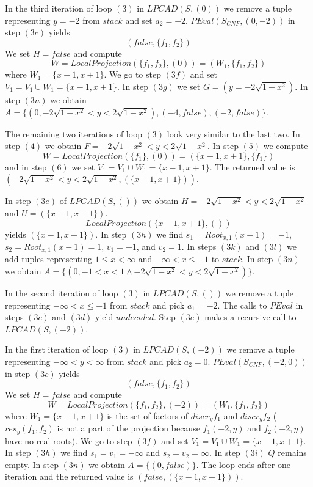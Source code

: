\documentclass[english]{amsart}
\numberwithin{equation}{section}
\numberwithin{figure}{section}
\begin{document}
In the third iteration of loop $(3)$ in $LPCAD(S,(0))$ we remove
a tuple representing $y=-2$ from $stack$ and set $a_{2}=-2$. $PEval(S_{CNF},(0,-2))$
in step $(3c)$ yields \[
(false,\{f_{1},f_{2}\})\]
We set $H=false$ and compute \[
W=LocalProjection(\{f_{1},f_{2}\},(0))=(W_{1},\{f_{1},f_{2}\})\]
where $W_{1}=\{x-1,x+1\}$. We go to step $(3f)$ and set $V_{1}=V_{1}\cup W_{1}=\{x-1,x+1\}$.
In step $(3g)$ we set $G=(y=-2\sqrt{1-x^{2}})$. In step $(3n)$
we obtain $A=\{(0,-2\sqrt{1-x^{2}}<y<2\sqrt{1-x^{2}}),(-4,false),(-2,false)\}$.

The remaining two iterations of loop $(3)$ look very similar to the
last two. In step $(4)$ we obtain $F=-2\sqrt{1-x^{2}}<y<2\sqrt{1-x^{2}}$.
In step $(5)$ we compute \[
W=LocalProjection(\{f_{1}\},(0))=(\{x-1,x+1\},\{f_{1}\})\]
 and in step $(6)$ we set $V_{1}=V_{1}\cup W_{1}=\{x-1,x+1\}$. The
returned value is $(-2\sqrt{1-x^{2}}<y<2\sqrt{1-x^{2}},(\{x-1,x+1\}))$.

In step $(3e)$ of $LPCAD(S,())$ we obtain $H=-2\sqrt{1-x^{2}}<y<2\sqrt{1-x^{2}}$
and $U=(\{x-1,x+1\})$. \[
LocalProjection(\{x-1,x+1\},())\]
 yields $(\{x-1,x+1\})$. In step $(3h)$ we find $s_{1}=Root_{x,1}(x+1)=-1$,
$s_{2}=Root_{x,1}(x-1)=1$, $v_{1}=-1$, and $v_{2}=1$. In steps
$(3k)$ and $(3l)$ we add tuples representing $1\leq x<\infty$ and
$-\infty<x\leq-1$ to $stack$. In step $(3n)$ we obtain $A=\{(0,-1<x<1\wedge-2\sqrt{1-x^{2}}<y<2\sqrt{1-x^{2}})\}$.

In the second iteration of loop $(3)$ in $LPCAD(S,())$ we remove
a tuple representing $-\infty<x\leq-1$ from $stack$ and pick $a_{1}=-2$.
The calls to $PEval$ in steps $(3c)$ and $(3d)$ yield $undecided$.
Step $(3e)$ makes a recursive call to $LPCAD(S,(-2))$.

In the first iteration of loop $(3)$ in $LPCAD(S,(-2))$ we remove
a tuple representing $-\infty<y<\infty$ from $stack$ and pick $a_{2}=0$.
$PEval(S_{CNF},(-2,0))$ in step $(3c)$ yields \[
(false,\{f_{1},f_{2}\})\]
We set $H=false$ and compute \[
W=LocalProjection(\{f_{1},f_{2}\},(-2))=(W_{1},\{f_{1},f_{2}\})\]
where $W_{1}=\{x-1,x+1\}$ is the set of factors of $discr_{y}f_{1}$
and $discr_{y}f_{2}$ ($res_{y}(f_{1},f_{2})$ is not a part of the
projection because $f_{1}(-2,y)$ and $f_{2}(-2,y)$ have no real
roots). We go to step $(3f)$ and set $V_{1}=V_{1}\cup W_{1}=\{x-1,x+1\}$.
In step $(3h)$ we find $s_{1}=v_{1}=-\infty$ and $s_{2}=v_{2}=\infty$.
In step $(3i)$ $Q$ remains empty. In step $(3n)$ we obtain $A=\{(0,false)\}$.
The loop ends after one iteration and the returned value is $(false,(\{x-1,x+1\}))$.
\end{document}
